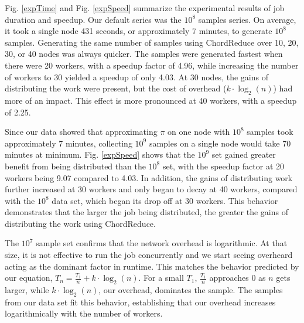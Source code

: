 \documentclass[10pt, conference, compsocconf]{IEEEtran}
\begin{document}
Fig. \ref{expTime} and Fig. \ref{expSpeed} summarize the experimental results of job duration and speedup.  Our default series was the $10^{8}$ samples series.  On average, it took a single node 431 seconds, or approximately 7 minutes, to generate $10^{8}$ samples.  Generating the same number of samples using ChordReduce over 10, 20, 30, or 40 nodes was always quicker.  The samples were generated fastest when there were 20 workers, with a speedup factor of 4.96, while increasing the number of workers to 30 yielded a speedup of only 4.03.  At 30 nodes, the gains of distributing the work were present, but the cost of overhead ($k \cdot \log_{2}(n)$) had more of an impact.  This effect is more pronounced at 40 workers, with a speedup of 2.25.

Since our data showed that approximating $\pi$ on one node with $10^{8}$ samples took approximately 7 minutes, collecting $10^{9}$ samples on a single node would take 70 minutes at minimum.  Fig. \ref{expSpeed} shows that the $10^{9}$ set gained greater benefit from being distributed than the $10^{8}$ set, with the speedup factor at 20 workers being 9.07 compared to 4.03.  In addition, the gains of distributing work further increased at 30 workers and only began to decay at 40 workers, compared with the $10^{8}$ data set, which began its drop off at 30 workers. This behavior demonstrates that the larger the job being distributed, the greater the gains of distributing the work using ChordReduce.

The $10^{7}$ sample set confirms that the network overhead is logarithmic.  At that size, it is not effective to run the job concurrently and we start seeing overheard acting as the dominant factor in runtime.  This matches the behavior predicted by our equation, $T_{n} = \frac{T_{1}}{n} + k \cdot \log_{2}(n)$. For a small $T_{1}$, $\frac{T_{1}}{n}$  approaches 0 as $n$ gets larger, while $k \cdot \log_{2}(n)$, our overhead, dominates the sample.  The samples from our data set fit this behavior, establishing that our overhead increases logarithmically with the number of workers.
\end{document}
